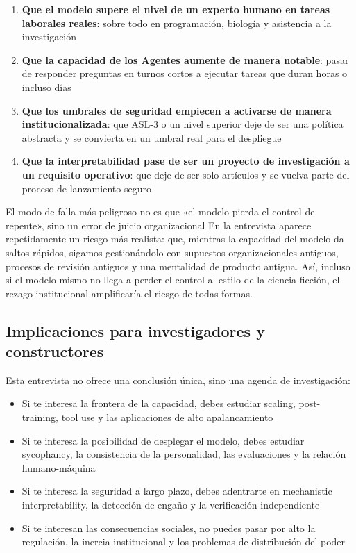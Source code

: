 \documentclass[a4paper]{article}
\begin{document}
\begin{enumerate}
    \item \textbf{Que el modelo supere el nivel de un experto humano en tareas laborales reales}: sobre todo en programación, biología y asistencia a la investigación
    \item \textbf{Que la capacidad de los Agentes aumente de manera notable}: pasar de responder preguntas en turnos cortos a ejecutar tareas que duran horas o incluso días
    \item \textbf{Que los umbrales de seguridad empiecen a activarse de manera institucionalizada}: que ASL-3 o un nivel superior deje de ser una política abstracta y se convierta en un umbral real para el despliegue
    \item \textbf{Que la interpretabilidad pase de ser un proyecto de investigación a un requisito operativo}: que deje de ser solo artículos y se vuelva parte del proceso de lanzamiento seguro
\end{enumerate}

\begin{warningbox}{El modo de falla más peligroso no es que «el modelo pierda el control de repente», sino un error de juicio organizacional}
En la entrevista aparece repetidamente un riesgo más realista: que, mientras la capacidad del modelo da saltos rápidos, sigamos gestionándolo con supuestos organizacionales antiguos, procesos de revisión antiguos y una mentalidad de producto antigua. Así, incluso si el modelo mismo no llega a perder el control al estilo de la ciencia ficción, el rezago institucional amplificaría el riesgo de todas formas.
\end{warningbox}

\subsection{Implicaciones para investigadores y constructores}

Esta entrevista no ofrece una conclusión única, sino una agenda de investigación:

\begin{itemize}
    \item Si te interesa la frontera de la capacidad, debes estudiar scaling, post-training, tool use y las aplicaciones de alto apalancamiento
    \item Si te interesa la posibilidad de desplegar el modelo, debes estudiar sycophancy, la consistencia de la personalidad, las evaluaciones y la relación humano-máquina
    \item Si te interesa la seguridad a largo plazo, debes adentrarte en mechanistic interpretability, la detección de engaño y la verificación independiente
    \item Si te interesan las consecuencias sociales, no puedes pasar por alto la regulación, la inercia institucional y los problemas de distribución del poder
\end{itemize}
\end{document}
